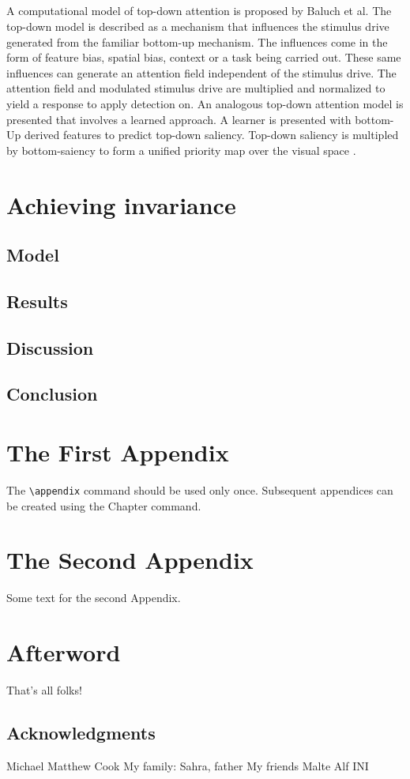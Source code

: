 \documentclass{report}
\begin{document}
\paragraph{}A computational model of top-down attention is proposed by Baluch et al. The top-down model is described as a mechanism that influences the stimulus drive generated from the familiar bottom-up mechanism. The influences come in the form of feature bias, spatial bias, context or a task being carried out. These same influences can generate an attention field independent of the stimulus drive. The attention field and modulated stimulus drive are multiplied and normalized to yield a response to apply detection on. An analogous top-down attention model is presented that involves a learned approach. A learner is presented with bottom-Up derived features to predict top-down saliency. Top-down saliency is multipled by bottom-saiency to form a unified priority map over the visual space \cite{Baluch2011}.

\chapter{Achieving invariance}

\section{Model}

\section{Results}

\section{Discussion}

\section{Conclusion}

\appendix

\chapter{The First Appendix}

The \verb"\appendix" command should be used only once. Subsequent appendices can
be created using the Chapter command.

\chapter{The Second Appendix}

Some text for the second Appendix.




\chapter{Afterword}

That's all folks!

\section{Acknowledgments}

Michael
Matthew Cook
My family: Sahra, father
My friends Malte Alf
INI
\end{document}
